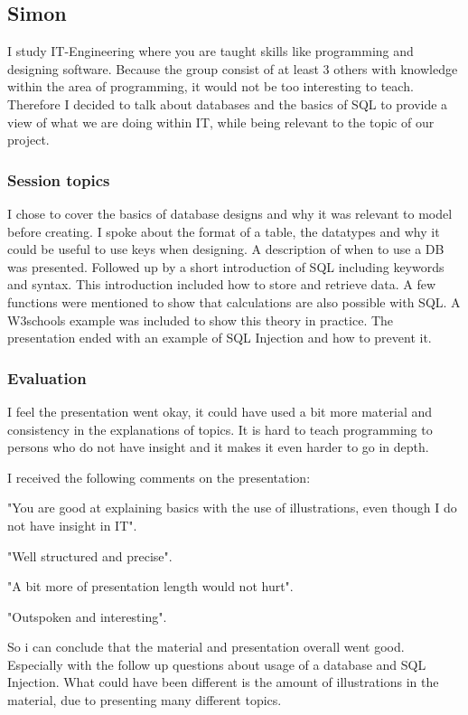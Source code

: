 \subsection{Simon}
I study IT-Engineering where you are taught skills like programming and designing software. Because the group consist of at least 3 others with knowledge within the area of programming, it would not be too interesting to teach. Therefore I decided to talk about databases and the basics of SQL to provide a view of what we are doing within IT, while being relevant to the topic of our project.

\subsubsection{Session topics}
I chose to cover the basics of database designs and why it was relevant to model before creating.
I spoke about the format of a table, the datatypes and why it could be useful to use keys when designing.
A description of when to use a DB was presented.
Followed up by a short introduction of SQL including keywords and syntax. This introduction included how to store and retrieve data. 
A few functions were mentioned to show that calculations are also possible with SQL.
A W3schools example was included to show this theory in practice. 
The presentation ended with an example of SQL Injection and how to prevent it.

\subsubsection{Evaluation}

I feel the presentation went okay, it could have used a bit more material and consistency in the explanations of topics. It is hard to teach programming to persons who do not have insight and it makes it even harder to go in depth.

I received the following comments on the presentation:

"You are good at explaining basics with the use of illustrations, even though I do not have insight in IT".

"Well structured and precise".

"A bit more of presentation length would not hurt".

"Outspoken and interesting".

So i can conclude that the material and presentation overall went good. Especially with the follow up questions about usage of a database and SQL Injection.
What could have been different is the amount of illustrations in the material, due to presenting many different topics. 